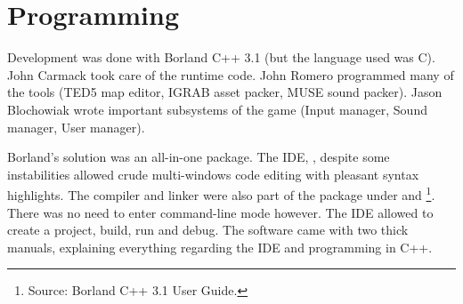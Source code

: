 \documentclass[book.tex]{subfiles}
\begin{document}
\section{Programming}
\label{section:programming}



Development was done with Borland C++ 3.1 (but the language used was C). John Carmack took care of the runtime code. John Romero programmed many of the tools (TED5 map editor, IGRAB asset packer, MUSE sound packer). Jason Blochowiak wrote important subsystems of the game (Input manager, Sound manager, User manager).\\
\par
Borland's solution was an all-in-one package. The IDE, , despite some instabilities allowed crude multi-windows code editing with pleasant syntax highlights. The compiler and linker were also part of the package under  and \footnote{Source: Borland C++ 3.1 User Guide.}. There was no need to enter command-line mode however. The IDE allowed to create a project, build, run and debug. The software came with two thick manuals, explaining everything regarding the IDE and programming in C++.\\
\end{document}
